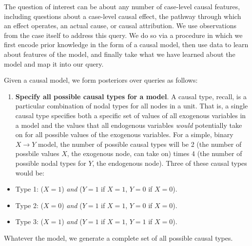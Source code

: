 \documentclass[
  12pt,
]{book}
\providecommand{\tightlist}{%
  \setlength{\itemsep}{0pt}\setlength{\parskip}{0pt}}
\begin{document}
The question of interest can be about any number of case-level causal features, including questions about a case-level causal effect, the pathway through which an effect operates, an actual cause, or causal attribution. We use observations from the case itself to address this query. We do so via a procedure in which we first encode prior knowledge in the form of a causal model, then use data to learn about features of the model, and finally take what we have learned about the model and map it into our query.

Given a causal model, we form posteriors over queries as follows:

\begin{enumerate}
\def\labelenumi{\arabic{enumi}.}
\tightlist
\item
  \textbf{Specify all possible causal types for a model}. A causal type, recall, is a particular combination of nodal types for all nodes in a unit. That is, a single causal type specifies both a specific set of values of all exogenous variables in a model and the values that all endogenous variables \emph{would} potentially take on for all possible values of the exogenous variables. For a simple, binary \(X \rightarrow Y\) model, the number of possible causal types will be 2 (the number of possbile values \(X\), the exogenous node, can take on) times 4 (the number of possible nodal types for \(Y\), the endogenous node). Three of these causal types would be:
\end{enumerate}

\begin{itemize}
\tightlist
\item
  Type 1: (\(X=1\)) \emph{and} (\(Y=1\) if \(X=1\), \(Y=0\) if \(X=0\)).
\item
  Type 2: (\(X=0\)) \emph{and} (\(Y=1\) if \(X=1\), \(Y=0\) if \(X=0\)).
\item
  Type 3: (\(X=1\)) \emph{and} (\(Y=1\) if \(X=1\), \(Y=1\) if \(X=0\)).
\end{itemize}

Whatever the model, we generate a complete set of all possible causal types.
\end{document}
